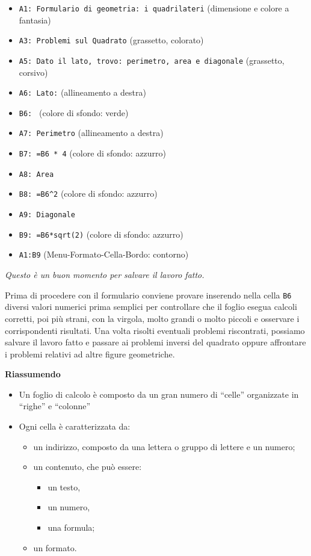 \begin{itemize} [noitemsep]
\item \texttt{A1: Formulario di geometria: i quadrilateri}
(dimensione e colore a fantasia)
\item \texttt{A3: Problemi sul Quadrato} 
(grassetto, colorato)
\item \texttt{A5: Dato il lato, trovo: perimetro, area e diagonale}
(grassetto, corsivo)
\item \texttt{A6: Lato:}
(allineamento a destra)
\item \texttt{B6: }
(colore di sfondo: verde)
\item \texttt{A7: Perimetro}
(allineamento a destra)
\item \texttt{B7: =B6 * 4}
(colore di sfondo: azzurro)
\item \texttt{A8: Area}
\item \texttt{B8: =B6\textasciicircum{}2}
(colore di sfondo: azzurro)
\item \texttt{A9: Diagonale}
\item \texttt{B9: =B6*sqrt(2)}
(colore di sfondo: azzurro)
\item \texttt{A1:B9}
(Menu-Formato-Cella-Bordo: contorno)
\end{itemize}

\emph{Questo è un buon momento per salvare il lavoro fatto.}

Prima di procedere con il formulario conviene provare inserendo nella cella
\texttt{B6} diversi valori numerici prima semplici per controllare che il foglio
esegua calcoli corretti, poi più strani, con la virgola, molto grandi o
molto piccoli e osservare i corrispondenti risultati.
Una volta risolti eventuali problemi riscontrati, possiamo salvare il lavoro
fatto e passare ai problemi inversi del quadrato oppure
affrontare i problemi relativi ad altre figure geometriche.

\textbf{Riassumendo}

\begin{itemize} [nosep]
\item 
Un foglio di calcolo è composto da un gran numero di ``celle'' organizzate
in ``righe'' e ``colonne''
\item 
Ogni cella è caratterizzata da:
\begin{itemize} [nosep]
\item 
un indirizzo, composto da una lettera o gruppo di lettere e un numero;
\item 
un contenuto, che può essere:
\begin{itemize}
\item 
un testo,
\item 
un numero,
\item 
una formula;
\end{itemize}
\item 
un formato.
\end{itemize}
\end{itemize}

